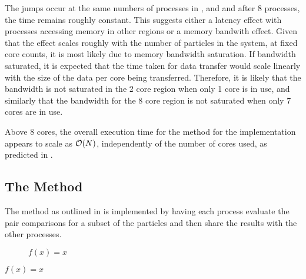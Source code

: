 The jumps occur at the same numbers of processes in
,
 and
and after 8 processes, the time remains roughly constant.
%
This suggests either a latency effect with processes accessing memory
in other \numa{} regions or a memory bandwith effect.
%
Given that the effect scales roughly with the number of particles
in the system, at fixed core counts, it is most likely due to
memory bandwidth saturation.
%
If bandwidth saturated, it is expected that the time taken for
data transfer would
scale linearly with the size of the data per core being transferred.
%
Therefore, it is likely that the bandwidth is not saturated in
the 2 core \numa{} region
when only 1 core is in use, and
similarly that the bandwidth for
the 8 core \numa{} region is not saturated
when only 7 cores are in use.

Above 8 cores, the overall execution time for
the \individualoperation{} method for the \replicateddata{} implementation
appears to scale as $\mathcal{O}{\left({ N }\right)}$, independently of the number of cores used,
as predicted in
.


%
%

\subsection{The \pairoperation{} Method}

The \pairoperation{} method as outlined in
is implemented by having each process evaluate the pair
comparisons for a subset of the particles and then share the
results with the other processes.

%

%
%
\begin{figure}[!h]
    
    \caption{
        \vZeroSpeedupCaption
            {\replicateddata{}}
            {\pairoperation{}}
            {$f(x) = x$}
    }
    \label{fig:v0_replicated_data_pair_operation_speedups}
\end{figure}


\vZeroSpeedupExplanation
    {}
    {\replicateddata{}}
    {\pairoperation{}}
    {$f(x) = x$}

